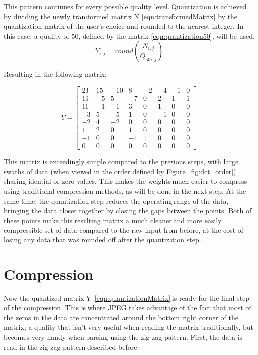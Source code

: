 \documentclass[11pt]{article}
\begin{document}
This pattern continues for every possible quality level.
Quantization is achieved by dividing the newly transformed matrix N \eqref{eqn:transformedMatrix} by the quantization matrix of the user's choice and rounded to the nearest integer.
In this case, a quality of 50, defined by the matrix \eqref{eqn:quantization50}, will be used.
\begin{equation}
  \label{eqn:quantization}
  Y_{i,j} = round\left( \frac{N_{i,j}}{Q_{50i,j}} \right)
\end{equation}

Resulting in the following matrix:

\begin{equation}
  \label{eqn:quantizationMatrix}
  Y = \begin{bmatrix}
    23 & 15 & -10 &  8 & -2 & -4 & -1 & 0 \\
    16 & -5 &   5 & -7 &  0 &  2 &  1 & 1 \\
    11 & -1 &  -1 &  3 &  0 &  1 &  0 & 0 \\
    -3 &  5 &  -5 &  1 &  0 & -1 &  0 & 0 \\
    -2 &  4 &  -2 &  0 &  0 &  0 &  0 & 0 \\
     1 &  2 &   0 &  1 &  0 &  0 &  0 & 0 \\
    -1 &  0 &   0 & -1 &  1 &  0 &  0 & 0 \\
     0 &  0 &   0 &  0 &  0 &  0 &  0 & 0 
  \end{bmatrix}
\end{equation}

This matrix is exceedingly simple compared to the previous steps, with large swaths of data (when viewed in the order defined by Figure~\ref{fig:dct_order}) sharing idential or zero values.
This makes the weights much easier to compress using traditional compression methods, as will be done in the next step.
At the same time, the quantization step reduces the operating range of the data, bringing the data closer together by closing the gaps between the points.
Both of these points make this resulting matrix a much cleaner and more easily compressible set of data compared to the raw input from before, at the cost of losing any data that was rounded off after the quantization step.

\section{Compression}
\label{sec: compression}

Now the quantized matrix Y~\eqref{eqn:quantizationMatrix} is ready for the final step of the compression.
This is where JPEG takes advantage of the fact that most of the zeros in the data are concentrated around the bottom right corner of the matrix; a quality that isn't very useful when reading the matrix traditionally, but becomes very handy when parsing using the zig-zag pattern.
First, the data is read in the zig-zag pattern described before.
\end{document}
